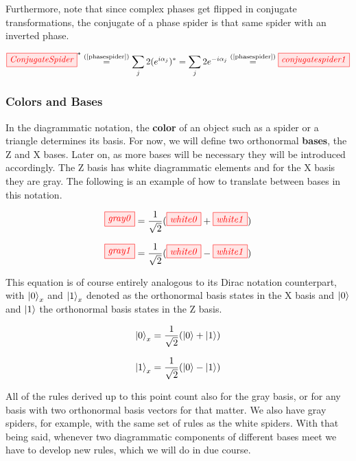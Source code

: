 \documentclass[]{article}
\newcommand{\equaltext}[1]{\ensuremath{\stackrel{\text{#1}}{=}}}
\begin{document}
Furthermore, note that since complex phases get flipped in conjugate transformations, the conjugate of a phase spider is that same spider with an inverted phase.

\begin{equation}
\label{equation:conjugatespider}
\tikzfig{ConjugateSpider}^* \equaltext{(\ref{phasespider})}  \sum\limits_{j}2(e^{i\alpha_j})^*=  \sum\limits_{j}2e^{-i\alpha_j} \equaltext{(\ref{phasespider})} \tikzfig{conjugatespider1}
\end{equation}

\subsubsection{Colors and Bases}
\label{coloursandbases}

In the diagrammatic notation, the \textbf{color} of an object such as a spider or a triangle determines its basis. For now, we will define two orthonormal \textbf{bases}, the Z and X bases. Later on, as more bases will be necessary they will be introduced accordingly. The Z basis has white diagrammatic elements and for the X basis they are gray. The following is an example of how to translate between bases in this notation.

\begin{equation}
\label{equation:gray0}
\tikzfig{gray0} =\frac{1}{\sqrt{2}}( \tikzfig{white0} + \tikzfig{white1})
\end{equation}

\begin{equation}
\label{equation:gray1}
\tikzfig{gray1} =\frac{1}{\sqrt{2}}( \tikzfig{white0} - \tikzfig{white1})
\end{equation}

This equation is of course entirely analogous to its Dirac notation counterpart, with $\ket{0}_x$ and $\ket{1}_x$ denoted as the orthonormal basis states in the X basis and $\ket{0}$ and $\ket{1}$ the orthonormal basis states in the Z basis.

\begin{equation}
\ket{0}_x = \frac{1}{\sqrt{2}}(\ket{0} + \ket{1})
\end{equation}

\begin{equation}
\ket{1}_x = \frac{1}{\sqrt{2}}(\ket{0} - \ket{1})
\end{equation}

All of the rules derived up to this point count also for the gray basis, or for any basis with two orthonormal basis vectors for that matter. We also have gray spiders, for example, with the same set of rules as the white spiders. With that being said, whenever two diagrammatic components of different bases meet we have to develop new rules, which we will do in due course. 
\end{document}
